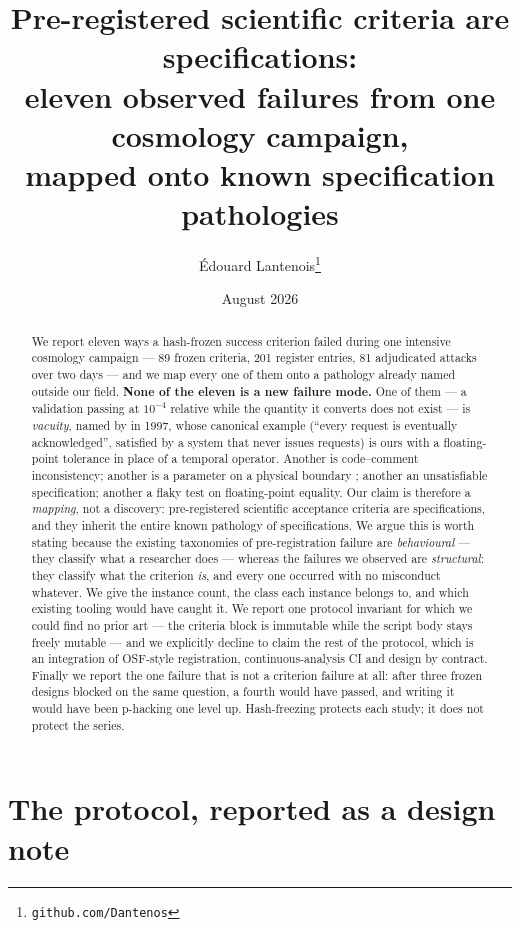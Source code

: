 \documentclass[11pt,a4paper]{article}
\title{\bf Pre-registered scientific criteria are specifications:\\
eleven observed failures from one cosmology campaign,\\
mapped onto known specification pathologies}
\author{\'Edouard Lantenois\thanks{\texttt{github.com/Dantenos}}}
\date{August 2026}
\begin{document}
\maketitle

\begin{abstract}
\noindent
We report eleven ways a hash-frozen success criterion failed during one intensive cosmology
campaign --- 89 frozen criteria, 201 register entries, 81 adjudicated attacks over two days
--- and we map every one of them onto a pathology already named outside our field.
\textbf{None of the eleven is a new failure mode.} One of them --- a validation passing at
$10^{-4}$ relative while the quantity it converts does not exist --- is \emph{vacuity}, named
by \citet{beer1997} in 1997, whose canonical example (``every request is eventually
acknowledged'', satisfied by a system that never issues requests) is ours with a
floating-point tolerance in place of a temporal operator. Another is code--comment
inconsistency; another is a parameter on a physical boundary \citep{feldman1998}; another an
unsatisfiable specification; another a flaky test on floating-point equality. Our claim is
therefore a \emph{mapping}, not a discovery: pre-registered scientific acceptance criteria
are specifications, and they inherit the entire known pathology of specifications. We argue
this is worth stating because the existing taxonomies of pre-registration failure
\citep{yamada2018,bakker2020} are \emph{behavioural} --- they classify what a researcher does
--- whereas the failures we observed are \emph{structural}: they classify what the criterion
\emph{is}, and every one occurred with no misconduct whatever. We give the instance count,
the class each instance belongs to, and which existing tooling would have caught it. We
report one protocol invariant for which we could find no prior art --- the criteria block is
immutable while the script body stays freely mutable --- and we explicitly decline to claim
the rest of the protocol, which is an integration of OSF-style registration,
continuous-analysis CI \citep{bj2017} and design by contract. Finally we report the one
failure that is not a criterion failure at all: after three frozen designs blocked on the
same question, a fourth would have passed, and writing it would have been p-hacking one level
up. Hash-freezing protects each study; it does not protect the series.
\end{abstract}

\section{The protocol, reported as a design note}
\label{sec:protocole}
\end{document}
